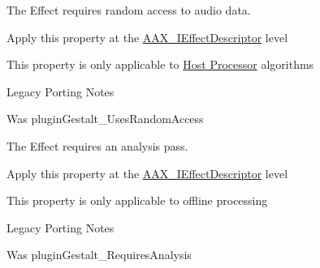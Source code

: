 \begin{Desc}
\begin{description}
 \item[{\em 
\hypertarget{a00283_a6571f4e41a5dd06e4067249228e2249eab0bbaabe0a03b37e5a69f04a6f306076}{}A\+A\+X\+\_\+e\+Property\+\_\+\+Uses\+Random\+Access\label{a00283_a6571f4e41a5dd06e4067249228e2249eab0bbaabe0a03b37e5a69f04a6f306076}
}]The Effect requires random access to audio data. \begin{DoxyItemize}
\item Apply this property at the \hyperlink{a00096}{A\+A\+X\+\_\+\+I\+Effect\+Descriptor} level \item This property is only applicable to \hyperlink{a00334}{Host Processor} algorithms\end{DoxyItemize}
\begin{DoxyRefDesc}{Legacy Porting Notes}
\item[\hyperlink{a00384__porting_notes000047}{Legacy Porting Notes}]Was plugin\+Gestalt\+\_\+\+Uses\+Random\+Access \end{DoxyRefDesc}
\item[{\em 
\hypertarget{a00283_a6571f4e41a5dd06e4067249228e2249ea925c49bb79454b33bf1d5f4cb09d373f}{}A\+A\+X\+\_\+e\+Property\+\_\+\+Requires\+Analysis\label{a00283_a6571f4e41a5dd06e4067249228e2249ea925c49bb79454b33bf1d5f4cb09d373f}
}]The Effect requires an analysis pass. \begin{DoxyItemize}
\item Apply this property at the \hyperlink{a00096}{A\+A\+X\+\_\+\+I\+Effect\+Descriptor} level \item This property is only applicable to offline processing\end{DoxyItemize}
\begin{DoxyRefDesc}{Legacy Porting Notes}
\item[\hyperlink{a00384__porting_notes000048}{Legacy Porting Notes}]Was plugin\+Gestalt\+\_\+\+Requires\+Analysis \end{DoxyRefDesc}

\end{description}
\end{Desc}
